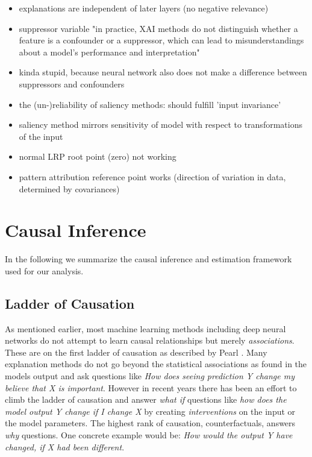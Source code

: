 \begin{itemize}
      \item explanations are independent of later layers (no negative relevance) \cite{Sixt2020}
      \item suppressor variable "in practice, XAI methods do not distinguish whether a feature is a confounder or a suppressor, which can lead to misunderstandings about a model's performance and interpretation"
      \item kinda stupid, because neural network also does not make a difference between suppressors and confounders \cite{Wilming2023}
      \item the (un-)reliability of saliency methods: should fulfill 'input invariance'
      \item saliency method mirrors sensitivity of model with respect to transformations of the input
      \item normal LRP root point (zero) not working
      \item pattern attribution reference point works (direction of variation in data, determined by covariances) \cite{Kindermans2019}
\end{itemize}


\section{Causal Inference}
In the following we summarize the causal inference and estimation framework used for our analysis. 
\subsection{Ladder of Causation}
As mentioned earlier, most machine learning methods including deep neural networks do not attempt to learn causal relationships but merely \textit{associations}. These are on the first ladder of causation as described by Pearl \cite{Pearl2009}. Many explanation methods do not go beyond the statistical associations as found in the models output and ask questions like \textit{How does seeing prediction Y change my believe that X is important}. However in recent years there has been an effort to climb the ladder of causation and answer \textit{what if} questions like \textit{how does the model output Y change if I change X} by creating \textit{interventions} on the input or the model parameters. The highest rank of causation, counterfactuals, answers \textit{why} questions. One concrete example would be: \textit{How would the output Y have changed, if X had been different}. 

